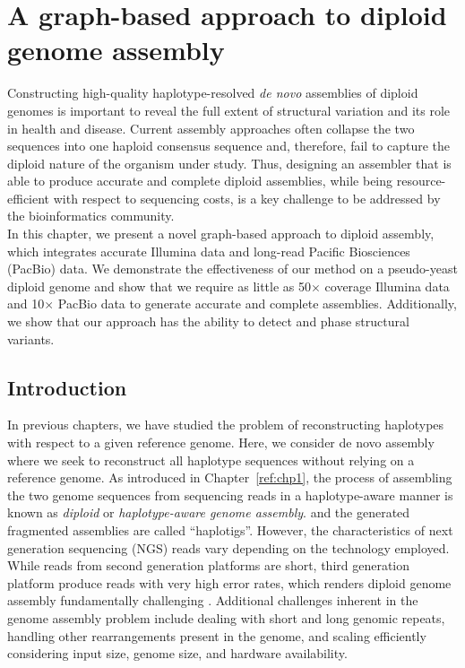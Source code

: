 \chapter{A graph-based approach to diploid genome assembly}
Constructing high-quality haplotype-resolved \textit{de novo} assemblies of diploid genomes is important to reveal the full extent of structural variation and its role in health and disease.
Current assembly approaches often collapse the two sequences into one haploid consensus sequence and, therefore, fail to capture the diploid nature of the organism under study.
Thus, designing an assembler that is able to produce accurate and complete diploid assemblies, while being resource-efficient with respect to sequencing costs, 
is a key challenge to be addressed by the bioinformatics community.\\

In this chapter, we present a novel graph-based approach to diploid assembly, which integrates accurate Illumina data and long-read Pacific Biosciences (PacBio) data.
We demonstrate the effectiveness of our method on a pseudo-yeast diploid genome and show that we require as little as 50$\times$ coverage Illumina data 
and 10$\times$ PacBio data to generate accurate and complete assemblies.
Additionally, we show that our approach has the ability to detect and phase structural variants.\\


\section{Introduction}
In previous chapters, we have studied the problem of reconstructing haplotypes with respect to a given reference genome. 
Here, we consider de novo assembly where we seek to reconstruct all haplotype sequences without relying on a reference genome.
As introduced in Chapter~\ref{ref:chp1}, the process of assembling the two genome sequences from sequencing reads in a haplotype-aware manner is known as \textit{diploid} or 
\textit{haplotype-aware genome assembly}. and the generated fragmented assemblies are called ``haplotigs''.
However, the characteristics of next generation sequencing (NGS) reads vary depending on the technology employed.
While reads from second generation platforms are short, third generation platform produce reads with very high error rates, which renders diploid genome assembly fundamentally challenging . 
Additional challenges inherent in the genome assembly problem include dealing with short and long genomic repeats, handling other rearrangements present in the genome, and scaling efficiently considering input size, genome size, and hardware availability.


